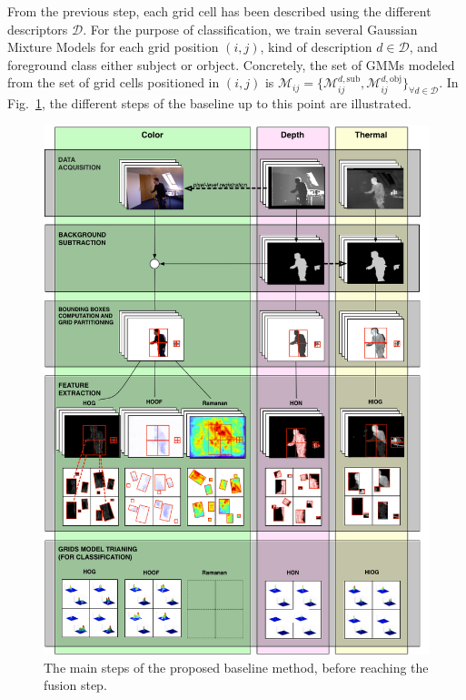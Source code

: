 \documentclass[10pt,twocolumn,letterpaper]{article}
\begin{document}
From the previous step, each grid cell has been described using the different descriptors $\mathcal{D}$. For the purpose of classification, we train several Gaussian Mixture Models for each grid position $(i,j)$, kind of description $d \in \mathcal{D}$, and foreground class either subject or orbject. Concretely, the set of GMMs modeled from the set of grid cells positioned in $(i,j)$ is $\mathcal{M}_{ij} = \{\mathcal{M}_{ij}^{d,\mathrm{sub}},\mathcal{M}_{ij}^{d,\mathrm{obj}}\}_{\forall d \in \mathcal{D}}$. In Fig.~\ref{fig:baseline}, the different steps of the baseline up to this point are illustrated.

\begin{figure}[ht!]
	\centering
	\includegraphics[width=\linewidth]{pictures/diagram.png}
	\caption{The main steps of the proposed baseline method, before reaching the fusion step.}
	\label{fig:baseline}
\end{figure}
\end{document}
